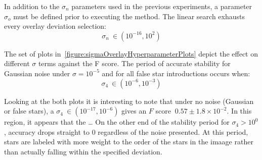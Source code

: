 In addition to the $\sigma_n$ parameters used in the previous experiments, a parameter $\sigma_o$ must be defined
prior to executing the  method.
The linear search exhausts every overlay deviation selection:
\begin{equation}
    \label{eq:linearSearchSigmaOverlay}
    \sigma_n \ \in (10^{-16}, 10^{2})
\end{equation}

\begin{figure}
\end{figure}

The set of plots in~\autoref{figure:sigmaOverlayHyperparameterPlots} depict the effect on different $\sigma$ terms
against the F score.
The period of accurate stability for Gaussian noise under $\sigma = 10^{-5}$ and for all false star introductions occurs
when:
\begin{equation}
    \label{eq:sigmaOverlayStableRegion}
    \sigma_4 \ \in (10^{-6}, 10^{-3})
\end{equation}

Looking at the both plots it is interesting to note that under no noise (Gaussian or false stars), a $\sigma_4 \ \in
(10^{-17}, 10^{-6})$ gives an $F$ score $~0.57 \pm 1.8 \times 10^{-2}$.
In this region, it appears that the \ldots
On the other end of the stability period for $\sigma_4 > 10^0$, accuracy drops straight to 0 regardless of the noise
presented.
At this period, stars are labeled with more weight to the order of the stars in the imaage rather than actually falling
within the specified deviation.

